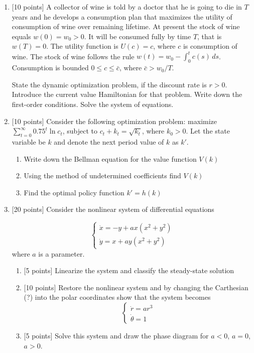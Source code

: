 \documentclass[pdftex,12pt,a4paper]{article}
\begin{document}
\begin{enumerate}
\item $[$10 points] A collector of wine is told by a doctor that he is going to die in $T$ years and he develops a consumption plan that maximizes the utility of consumption of wine over remaining lifetime. At present the stock of wine equals $w(0)=w_0>0$. It will be consumed fully by time $T$, that is $w(T)=0$. The utility function is $U(c)=c$, where $c$ is consumption of wine. The stock of wine follows the rule $w(t)=w_0-\int_0^t c(s) \, ds$. Consumption is bounded $0\leq c \leq \bar{c}$, where $\bar{c}>w_0/T$.

State the dynamic optimization problem, if the discount rate is $r>0$. Introduce the current value Hamiltonian for that problem. Write down the first-order conditions. Solve the system of equations.

\item $[$10 points] Consider the following optimization problem: maximize $\sum_{t=0}^{\infty} 0.75^t \ln c_t$, subject to $c_t+k_t=\sqrt{k_t}$, where $k_0>0$. Let the state variable be $k$ and denote the next period value of $k$ as $k'$.

\begin{enumerate}
\item Write down the Bellman equation for the value function $V(k)$
\item Using the method of undetermined coefficients find $V(k)$
\item Find the optimal policy function $k'=h(k)$
\end{enumerate}

\item $[$20 points] Consider the nonlinear system of differential equations

\[
\begin{cases}
\dot{x}=-y+ax(x^2+y^2) \\
\dot{y}=x+ay(x^2+y^2)
\end{cases}
\]
where $a$ is a parameter.

\begin{enumerate}
\item $[$5 points] Linearize the system and classify the steady-state solution
\item $[$10 points] Restore the nonlinear system and by changing the Carthesian (?) into the polar coordinates show that the system becomes
\[
\begin{cases}
\dot{r}=ar^3 \\
\dot{\theta}=1
\end{cases}
\]

\item $[$5 points] Solve this system and draw the phase diagram for $a<0$, $a=0$, $a>0$.
\end{enumerate}


\end{enumerate}
\end{document}
